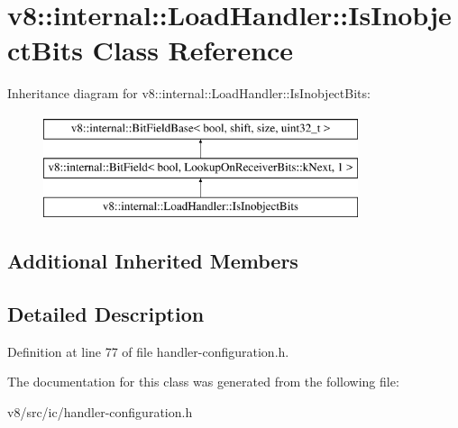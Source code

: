 \hypertarget{classv8_1_1internal_1_1LoadHandler_1_1IsInobjectBits}{}\section{v8\+:\+:internal\+:\+:Load\+Handler\+:\+:Is\+Inobject\+Bits Class Reference}
\label{classv8_1_1internal_1_1LoadHandler_1_1IsInobjectBits}
Inheritance diagram for v8\+:\+:internal\+:\+:Load\+Handler\+:\+:Is\+Inobject\+Bits\+:\begin{figure}[H]
\begin{center}
\leavevmode
\includegraphics[height=3.000000cm]{classv8_1_1internal_1_1LoadHandler_1_1IsInobjectBits}
\end{center}
\end{figure}
\subsection*{Additional Inherited Members}


\subsection{Detailed Description}


Definition at line 77 of file handler-\/configuration.\+h.



The documentation for this class was generated from the following file\+:\begin{DoxyCompactItemize}
\item 
v8/src/ic/handler-\/configuration.\+h\end{DoxyCompactItemize}
